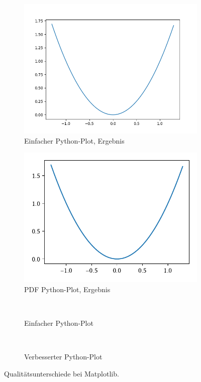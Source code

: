 \begin{figure}
\begin{subfigure}{.5\textwidth}\centering
\includegraphics[width=\linewidth]{bilder/pyplot1.png}
\caption{Einfacher Python-Plot, Ergebnis}
\end{subfigure}
\begin{subfigure}{.5\textwidth}\centering
\includegraphics[width=\linewidth]{bilder/pyplot2.pdf}
\caption{PDF Python-Plot, Ergebnis}
\end{subfigure}
\\

\begin{subfigure}{\textwidth}
%
\caption{Einfacher Python-Plot}%
\end{subfigure}
\\
\begin{subfigure}{\textwidth}
%
\caption{Verbesserter Python-Plot}%
\end{subfigure}
\caption{Qualitätsunterschiede bei Matplotlib.}
\label{fig:pyplot}
\end{figure}

